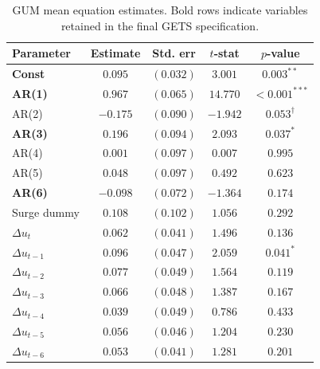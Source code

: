 \begin{table}[H]
\centering
\caption{GUM mean equation estimates. Bold rows indicate variables retained in the
final GETS specification.}
\small{
\begin{tabular*}{\textwidth}{@{\extracolsep{\fill}}lcccc}
\hline \hline
\rule{0pt}{12pt}\textbf{Parameter} & \textbf{Estimate} & \textbf{Std. err} & \textbf{$t$-stat} & \textbf{$p$-value} \\[4pt]
\hline
\rule{0pt}{12pt}\textbf{Const}                 & $\mathbf{0.095}$ & $\mathbf{(0.032)}$ & $\mathbf{3.001}$ & $\mathbf{0.003^{**}}$ \\[2pt]
\textbf{AR(1)}                                  & $\mathbf{0.967}$ & $\mathbf{(0.065)}$ & $\mathbf{14.770}$ & $\mathbf{{<}0.001^{***}}$ \\[2pt]
AR(2)                                           & $-0.175$ & $(0.090)$ & $-1.942$ & $0.053^{\dagger}$ \\[2pt]
\textbf{AR(3)}                                  & $\mathbf{0.196}$ & $\mathbf{(0.094)}$ & $\mathbf{2.093}$ & $\mathbf{0.037^{*}}$ \\[2pt]
AR(4)                                           & $0.001$ & $(0.097)$ & $0.007$ & $0.995$ \\[2pt]
AR(5)                                           & $0.048$ & $(0.097)$ & $0.492$ & $0.623$ \\[2pt]
\textbf{AR(6)}                                  & $\mathbf{-0.098}$ & $\mathbf{(0.072)}$ & $\mathbf{-1.364}$ & $\mathbf{0.174}$ \\[2pt]
Surge dummy                                     & $0.108$ & $(0.102)$ & $1.056$ & $0.292$ \\[2pt]
$\Delta u_{t}$                                  & $0.062$ & $(0.041)$ & $1.496$ & $0.136$ \\[2pt]
$\Delta u_{t-1}$                                & $0.096$ & $(0.047)$ & $2.059$ & $0.041^{*}$ \\[2pt]
$\Delta u_{t-2}$                                & $0.077$ & $(0.049)$ & $1.564$ & $0.119$ \\[2pt]
$\Delta u_{t-3}$                                & $0.066$ & $(0.048)$ & $1.387$ & $0.167$ \\[2pt]
$\Delta u_{t-4}$                                & $0.039$ & $(0.049)$ & $0.786$ & $0.433$ \\[2pt]
$\Delta u_{t-5}$                                & $0.056$ & $(0.046)$ & $1.204$ & $0.230$ \\[2pt]
$\Delta u_{t-6}$                                & $0.053$ & $(0.041)$ & $1.281$ & $0.201$ \\[2pt]

\end{tabular*}}
\end{table}
